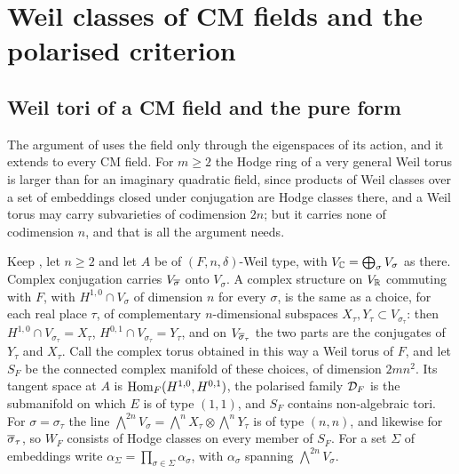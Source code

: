\section{Weil classes of CM fields and the polarised criterion}\label{sec:cmcriterion}

\subsection{Weil tori of a CM field and the pure form}
\label{ssec:cmweiltori}

The argument of  uses the field only through the
eigenspaces of its action, and it extends to every CM field. For $m\ge2$ the
Hodge ring of a very general Weil torus is larger than for an imaginary
quadratic field, since products of Weil classes over a set of embeddings
closed under conjugation are Hodge classes there, and a Weil torus may carry
subvarieties of codimension $2n$; but it carries none of codimension $n$, and
that is all the argument needs.

\begin{setupenv}\label{setup:cmweiltori}
Keep \cite[Setup~17.1]{paperI}, let $n\ge2$ and let $A$ be of $(F,n,\delta)$-Weil
type, with $V_{\mathbb{C}}=\bigoplus_{\sigma}V_{\sigma}$ as there. Complex
conjugation carries $V_{\overline{\sigma}}$ onto $V_{\sigma}$. A complex structure on
$V_{\mathbb{R}}$ commuting with $F$, with $H^{1,0}\cap V_{\sigma}$ of dimension $n$
for every $\sigma$, is the same as a choice, for each real place $\tau$, of
complementary $n$-dimensional subspaces $X_{\tau},Y_{\tau}\subset
V_{\sigma_{\tau}}$: then $H^{1,0}\cap V_{\sigma_{\tau}}=X_{\tau}$,
$H^{0,1}\cap V_{\sigma_{\tau}}=Y_{\tau}$, and on $V_{\overline{\sigma}_{\tau}}$ the
two parts are the conjugates of $Y_{\tau}$ and $X_{\tau}$. Call the complex
torus obtained in this way a Weil torus of $F$, and let $S_{F}$ be the
connected complex manifold of these choices, of dimension $2mn^{2}$. Its
tangent space at $A$ is $\operatorname{Hom}_{F}(H^{1,0},H^{0,1})$, the polarised family
$\mathcal{D}_{F}$ is the submanifold on which $E$ is of type $(1,1)$, and $S_{F}$
contains non-algebraic tori. For $\sigma=\sigma_{\tau}$ the line
$\bigwedge^{2n}V_{\sigma}=\bigwedge^{n}X_{\tau}\otimes\bigwedge^{n}Y_{\tau}$ is
of type $(n,n)$, and likewise for $\overline{\sigma}_{\tau}$, so $W_{F}$ consists
of Hodge classes on every member of $S_{F}$. For a set $\Sigma$ of
embeddings write $\alpha_{\Sigma}=\prod_{\sigma\in\Sigma}\alpha_{\sigma}$,
with $\alpha_{\sigma}$ spanning $\bigwedge^{2n}V_{\sigma}$.
\end{setupenv}

